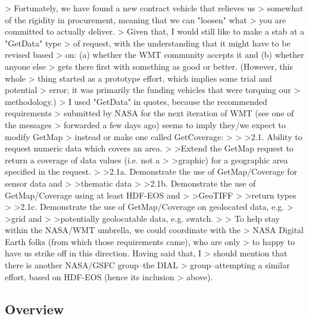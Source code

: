 \documentclass{article}
\begin{document}
>          Fortunately, we have found a new contract vehicle that relieves us
> somewhat of the rigidity in procurement, meaning that we can "loosen" what
> you are committed to actually deliver.
>          Given that, I would still like to make a stab at a "GetData" type
> of request, with the understanding that it might have to be revised based
> on: (a) whether the WMT community accepts it and (b) whether anyone else
> gets there first with something as good or better.  (However, this whole
> thing started as a prototype effort, which implies some trial and potential
> error; it was primarily the funding vehicles that were torquing our
> methodology.)
>          I used "GetData" in quotes, because the recommended requirements
> submitted by NASA for the next iteration of WMT (see one of the messages
> forwarded a few days ago) seems to imply they/we expect to modify GetMap
> instead or make one called GetCoverage:
>
> >2.1. Ability to request numeric data which covers an area.
> >Extend the GetMap request to return a coverage of data values (i.e. not a
> >graphic) for a geographic area specified in the request.
> >2.1a.   Demonstrate the use of GetMap/Coverage for sensor data and
> >thematic data
> >2.1b.  Demonstrate the use of GetMap/Coverage using at least HDF-EOS and
> >GeoTIFF
> >return types
> >2.1c.  Demonstrate the use of GetMap/Coverage on geolocated data, e.g.
> >grid and
> >potentially geolocatable data, e.g. swatch.
>
> To help stay within the NASA/WMT umbrella, we could coordinate with the
> NASA Digital Earth folks (from which those requirements came), who are only
> to happy to have us strike off in this direction.  Having said that, I
> should mention that there is another NASA/GSFC group--the DIAL
> group--attempting a similar effort, based on HDF-EOS (hence its inclusion
> above).



\subsection{Overview}
\end{document}
